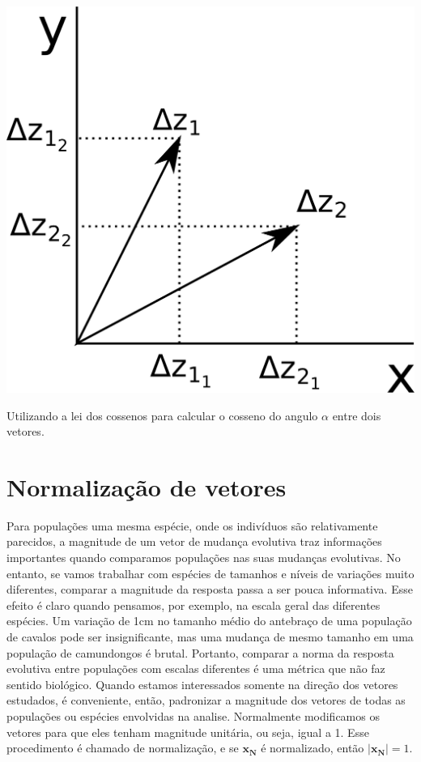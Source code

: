 \documentclass[portuges,]{tufte-handout}
\begin{document}
\begin{marginfigure}
\includegraphics{./figuras/leidoscossenos.png}
\caption{Utilizando a lei dos cossenos para calcular o cosseno
do angulo \(\alpha\) entre dois vetores.}
\label{leidoscossenos}
\end{marginfigure}

\section{Normalização de vetores}\label{normalizauxe7uxe3o-de-vetores}

Para populações uma mesma espécie, onde os indivíduos são relativamente
parecidos, a magnitude de um vetor de mudança evolutiva traz informações
importantes quando comparamos populações nas suas mudanças evolutivas.
No entanto, se vamos trabalhar com espécies de tamanhos e níveis de
variações muito diferentes, comparar a magnitude da resposta passa a ser
pouca informativa. Esse efeito é claro quando pensamos, por exemplo, na
escala geral das diferentes espécies. Um variação de 1cm no tamanho
médio do antebraço de uma população de cavalos pode ser insignificante,
mas uma mudança de mesmo tamanho em uma população de camundongos é
brutal. Portanto, comparar a norma da resposta evolutiva entre
populações com escalas diferentes é uma métrica que não faz sentido
biológico. Quando estamos interessados somente na direção dos vetores
estudados, é conveniente, então, padronizar a magnitude dos vetores de
todas as populações ou espécies envolvidas na analise. Normalmente
modificamos os vetores para que eles tenham magnitude unitária, ou seja,
igual a 1. Esse procedimento é chamado de normalização, e se
$\mathbf{x_N}$ é normalizado, então $|\mathbf{x_N}| = 1$.
\end{document}
